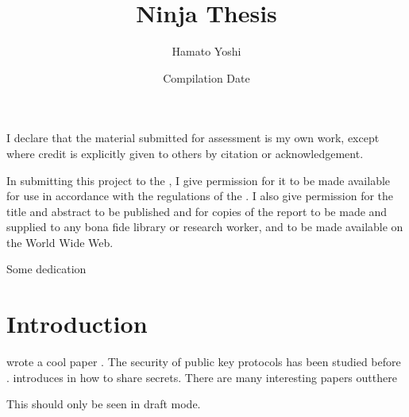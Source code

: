 \documentclass[
final
]{sta-thesis}
\title{Ninja Thesis}
\author{Hamato Yoshi}
\date{Compilation Date}
\begin{document}
\maketitle 
\frontmatter
\thispagestyle{empty}
\begin{abstract}

\end{abstract}
\newpage
\begin{declaration}
I declare that the material submitted for assessment is my own work,
except where credit is explicitly given to others by citation or
acknowledgement.
\end{declaration}

\begin{copyrightnotice}
In submitting this project to the \emph{\theuniversity}, I give
permission for it to be made available for use in accordance with the
regulations of the \emph{\theuniversity}. I also give permission for
the title and abstract to be published and for copies of the report to
be made and supplied to any bona fide library or research worker, and
to be made available on the World Wide Web. 
\end{copyrightnotice}

\begin{dedication}
Some dedication
\end{dedication}

\tableofcontents

\mainmatter

\chapter{Introduction}
\nocite{*}
\citeauthor{Shannon1946} wrote a cool paper \citep{Shannon1946}. The security of public key protocols has been studied before \citep{Dolev1983}. \citeauthor{Shamir1979} introduces in \citet{Shamir1979} how to share secrets.
There are many interesting papers outthere \cite{Needham1978,Rivest1978,Merkle1978,Diffie1976,Shannon1949,Ziv1977, Huffman1952, Hamming1950}

\begin{fncycomment}
This should only be seen in draft mode.
\end{fncycomment}
\end{document}
